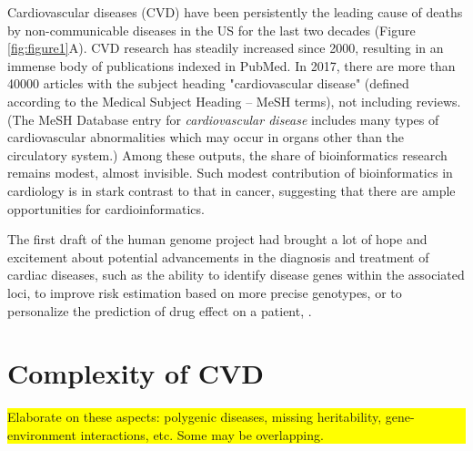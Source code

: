 \documentclass{bioinfo}
\newcommand{\todo}[1]{\colorbox{yellow}{\parbox{1\linewidth}{#1}}}
\begin{document}
Cardiovascular diseases (CVD) have been persistently the leading cause of deaths by non-communicable diseases in the US for the last two decades (Figure \ref{fig:figure1}A). CVD research has steadily increased since 2000, resulting in an immense body of publications indexed in PubMed. In 2017, there are more than 40000 articles with the subject heading "cardiovascular disease" (defined according to the Medical Subject Heading -- MeSH terms), not including reviews. (The MeSH Database entry for \textit{cardiovascular disease} includes many types of cardiovascular abnormalities which may occur in organs other than the circulatory system.) Among these outputs, the share of bioinformatics research remains modest, almost invisible. Such modest contribution of bioinformatics in cardiology is in stark contrast to that in cancer, suggesting that there are ample opportunities for cardioinformatics.

The first draft of the human genome project had brought a lot of hope and excitement about potential advancements in the diagnosis and treatment of cardiac diseases, such as the ability to identify disease genes within the associated loci, to improve risk estimation based on more precise genotypes, or to personalize the prediction of drug effect on a patient, \cite{Komajda:2001:heart}.



\section{Complexity of CVD}

\todo{Elaborate on these aspects: polygenic diseases, missing heritability, gene-environment interactions, etc. Some may be overlapping.}
\end{document}
